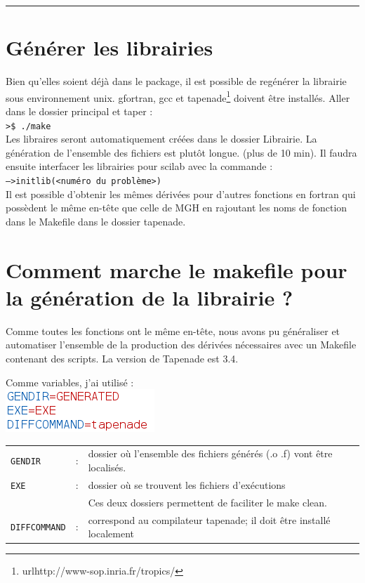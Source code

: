 \rule{\linewidth}{1pt}


\section{Générer les librairies}


Bien qu'elles soient déjà dans le package, il est possible de regénérer la librairie sous environnement unix.
gfortran, gcc et tapenade\footnote{url{http://www-sop.inria.fr/tropics/}} doivent être installés. 
Aller dans le dossier principal et taper : \\
{\tt >\$ ./make}\\
Les libraires seront automatiquement créées dans le dossier Librairie. La génération de l'ensemble des fichiers 
est plut\^ot longue. (plus de 10 min). Il faudra ensuite interfacer les librairies pour scilab avec la commande :\\
{\tt -->initlib(<numéro du problème>)}\\
Il est possible d'obtenir les mêmes dérivées pour d'autres fonctions en fortran qui possèdent
le même en-tête que celle de MGH en rajoutant les noms de fonction dans le Makefile dans le 
dossier tapenade.



\section{Comment marche le makefile pour la génération de la librairie ?}

Comme toutes les fonctions ont le même en-tête, nous avons pu généraliser et automatiser l'ensemble
de la production des dérivées nécessaires  avec un Makefile contenant des scripts. La version de Tapenade
est 3.4.

Comme variables, j'ai utilisé : \\


\includegraphics[scale=0.7]{code/var.png}\\
\begin{tabular}{lll}
\verb!GENDIR!&:& dossier où l'ensemble des fichiers générés (.o .f) vont être localisés.\\
\verb!EXE!&:& dossier où se trouvent les fichiers d'exécutions \\
&&Ces deux dossiers permettent de faciliter le make clean.\\
\verb!DIFFCOMMAND!&:& correspond au compilateur tapenade; il doit être installé localement \\
\end{tabular}


